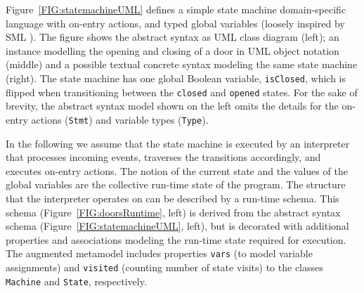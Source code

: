 \documentclass[english,submission]{programming}
\begin{document}
Figure~\ref{FIG:statemachineUML} defines a simple state machine domain-specific language with
on-entry actions, and typed global variables (loosely inspired by SML \cite{vanRozen19}).
The figure shows the abstract syntax as UML class diagram (left); an instance modelling the
opening and closing of a door in UML object notation (middle) and a possible textual concrete
syntax modeling the same state machine (right).
%
The state machine has one global Boolean variable, \lstinline{isClosed}, which is flipped when
transitioning between the \lstinline{closed} and \lstinline{opened} states. For the sake of brevity,
the abstract syntax model shown on the left omits the details for the on-entry
actions (\lstinline{Stmt}) and variable types (\lstinline{Type}).




In the following we assume that the state machine is executed by an interpreter that processes
incoming events, traverses the transitions accordingly, and executes on-entry actions. The notion
of the current state and the values of the global variables are the collective run-time state of
the program. The structure that the interpreter operates on can be described by a run-time schema.
This schema (Figure~\ref{FIG:doorsRuntime}, left) is derived from the abstract syntax
schema (Figure~\ref{FIG:statemachineUML}, left), but is decorated with additional properties and
associations modeling the run-time state required for execution. The augmented metamodel includes
properties \lstinline{vars} (to model variable assignments) and \lstinline{visited} (counting
number of state visits) to the classes \lstinline{Machine} and \lstinline{State}, respectively.
\end{document}

